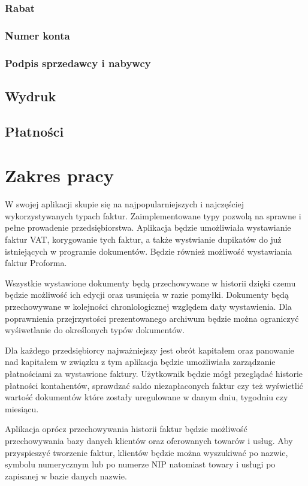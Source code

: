 \documentclass[12pt, a4paper]{article}
\begin{document}
\subsubsection{Rabat}
\subsubsection{Numer konta}
\subsubsection{Podpis sprzedawcy i nabywcy}
\subsection{Wydruk}
\subsection{Płatności}
\section{Zakres pracy}
W swojej aplikacji skupie się na najpopularniejszych i najczęściej
wykorzystywanych typach faktur. Zaimplementowane typy pozwolą na sprawne i pełne
prowadenie przedsiębiorstwa. Aplikacja będzie umożliwiała wystawianie faktur
VAT, korygowanie tych faktur, a także wystwianie dupikatów do już istniejących w
programie dokumentów. Będzie również możliwość wystawiania faktur Proforma. 

Wszystkie wystawione dokumenty będą przechowywane w historii dzięki czemu będzie
możliwość ich edycji oraz usunięcia w razie pomyłki. Dokumenty będą
przechowywane w kolejności chronlologicznej względem daty wystawienia. Dla
poprawnienia przejrzystości prezentowanego archiwum będzie można ograniczyć
wyśiwetlanie do określonych typów dokumentów.

Dla każdego przedsiębiorcy najważniejszy jest obrót kapitałem oraz panowanie nad
kapitałem w związku z tym aplikacja będzie umożliwiała zarządzanie płatnościami
za wystawione faktury. Użytkownik będzie mógł przeglądać historie płatności
kontahentów, sprawdzać saldo niezapłaconych faktur czy też wyświetlić wartość
dokumentów które zostały uregulowane w danym dniu, tygodniu czy miesiącu.

Aplikacja oprócz przechowywania historii faktur będzie możliwość przechowywania
bazy danych klientów oraz oferowanych towarów i usług. Aby przyspieszyć
tworzenie faktur, klientów będzie można wyszukiwać po nazwie, symbolu
numerycznym lub po numerze NIP natomiast towary i usługi po zapisanej w bazie
danych nazwie.
\end{document}
